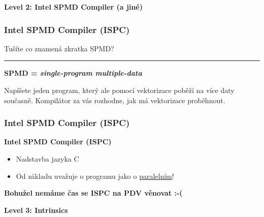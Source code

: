 \documentclass[usenames,dvipsnames,9pt]{beamer}
\begin{document}
\begin{frame}[fragile]
  \begin{center}
    \LARGE\bf Level 2: Intel SPMD Compiler (a jiné) \hspace{10pt}  
  \end{center}
\end{frame}

\begin{frame}
  \frametitle{Intel SPMD Compiler (ISPC)}

  \begin{center}
    \LARGE Tušíte co znamená zkratka SPMD?
  \end{center}

  \vspace{1em}\hrule\vspace{1em}

  \textbf{SPMD = \emph{single-program multiple-data}}

  Napíšete jeden program, který ale pomocí vektorizace poběží na více daty současně.
  Kompilátor za vás rozhodne, jak má vektorizace proběhnout.
\end{frame}

\begin{frame}
  \frametitle{Intel SPMD Compiler (ISPC)}

  \textbf{Intel SPMD Compiler (ISPC)}
  \begin{itemize}
    \item Nadstavba jazyka C
    \item Od základu uvažuje o programu jako o \underline{paralelním}!
  \end{itemize}

  \vspace{3em}
  \pause
  \begin{center}
    \LARGE\bf Bohužel nemáme čas se ISPC na PDV věnovat :-(
  \end{center}
\end{frame}

\begin{frame}[fragile]
  \begin{center}
    \LARGE\bf Level 3: Intrinsics \hspace{10pt}   
  \end{center}
\end{frame}
\end{document}

